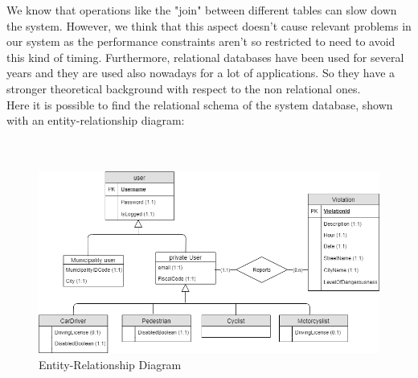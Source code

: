 \documentclass[titlepage]{article}
\begin{document}
\begin{itemize}
We know that operations like the "join" between different tables can slow down the system. However, we think that this aspect doesn't cause relevant problems in our system as the performance constraints aren't so restricted to need to avoid this kind of timing. Furthermore, relational databases have been used for several years and they are used also nowadays for a lot of applications. So they have a stronger theoretical background with respect to the non relational ones.\\

\newpage
Here it is possible to find the relational schema of the system database, shown with an entity-relationship diagram: \\ \\ \\


\begin{figure}[h]
	\includegraphics[scale=0.55]{Diagrams/ER diagram.png}
	\caption{Entity-Relationship Diagram}
\end{figure}
\FloatBarrier

	
\end{itemize}
\end{document}
